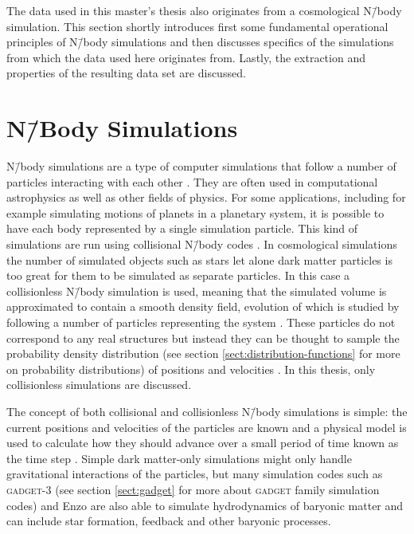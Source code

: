\documentclass[english, twoside]{HYgradu}
\begin{document}
The data used in this master's thesis also originates from a cosmological N\=/body simulation. This section shortly introduces first some fundamental operational principles of N\=/body simulations and then discusses specifics of the simulations from which the data used here originates from. Lastly, the extraction and properties of the resulting data set are discussed.


\section{N\=/Body Simulations}
N\=/body simulations are a type of computer simulations that follow a number of particles interacting with each other \citep{binney2008galactic}. They are often used in computational astrophysics as well as other fields of physics. For some applications, including for example simulating motions of planets in a planetary system, it is possible to have each body represented by a single simulation particle. This kind of simulations are run using collisional N\=/body codes \citep{binney2008galactic}. In cosmological simulations the number of simulated objects such as stars let alone dark matter particles is too great for them to be simulated as separate particles. In this case a collisionless N\=/body simulation is used, meaning that the simulated volume is approximated to contain a smooth density field, evolution of which is studied by following a number of particles representing the system \citep{binney2008galactic}. These particles do not correspond to any real structures but instead they can be thought to sample the probability density distribution (see section \ref{sect:distribution-functions} for more on probability distributions) of positions and velocities \citep{binney2008galactic}. In this thesis, only collisionless simulations are discussed.

The concept of both collisional and collisionless N\=/body simulations is simple: the current positions and velocities of the particles are known and a physical model is used to calculate how they should advance over a small period of time known as the time step \citep{binney2008galactic}. Simple dark matter-only simulations might only handle gravitational interactions of the particles, but many simulation codes such as \textsc{gadget-3} \citep{springel2005cosmological} (see section \ref{sect:gadget} for more about \textsc{gadget} family simulation codes) and Enzo \citep{norman2007simulating} are also able to simulate hydrodynamics of baryonic matter and can include star formation, feedback and other baryonic processes.
\end{document}
